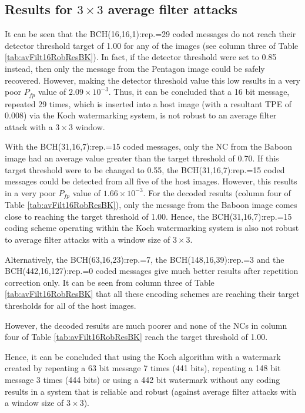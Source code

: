 \documentclass[12pt]{report}
\begin{document}
\subsection{Results for $3 \times 3$ average filter attacks}
It can be seen that the BCH(16,16,1):rep.=29 coded messages do not reach their
detector threshold target of 1.00 for any of the images (see column three of Table \ref{tab:avFilt16RobResBK}). 
In fact, if the detector threshold were set to 0.85 instead, then only the message from the Pentagon
image could be safely recovered. However, making the detector threshold value this low results in a very
poor $P_{fp}$ value of $2.09\times 10^{-3}$.
Thus, it can be concluded that a 16 bit message, repeated 29 times, which is inserted into a host image
(with a resultant TPE of 0.008) via the Koch watermarking system, is not robust to an average filter attack with a $3\times 3$ window.

With the BCH(31,16,7):rep.=15 coded messages, only the NC from the Baboon image
had an average value greater than the target threshold of 0.70. If this target threshold were to be changed to 0.55,
the BCH(31,16,7):rep.=15 coded messages could be detected from all five of the host images. However, this results
in a very poor $P_{fp}$ value of $1.66\times 10^{-3}$. For the decoded results (column four of Table \ref{tab:avFilt16RobResBK}),
only the message from the Baboon image comes close to reaching the target threshold of 1.00. Hence, the
BCH(31,16,7):rep.=15 coding scheme operating within the Koch watermarking system is also not robust to
average filter attacks with a window size of $3\times 3$.

Alternatively, the BCH(63,16,23):rep.=7, the BCH(148,16,39):rep.=3 and the
BCH(442,16,127):rep.=0 coded messages give much better results after repetition correction only.
It can be seen from column three of Table \ref{tab:avFilt16RobResBK} that all these encoding schemes are 
reaching their target thresholds for all of the host images. 

However, the decoded results
are much poorer and none of the NCs in column four of Table \ref{tab:avFilt16RobResBK}
reach the target threshold of 1.00. 

Hence, it can be concluded that using the Koch algorithm with a watermark created by repeating
a 63 bit message 7 times (441 bits), repeating a 148 bit message 3 times (444 bits) or using a 442 bit watermark without any coding
results in a system that is reliable and robust (against average filter attacks with a window size of $3\times 3$).
\end{document}
